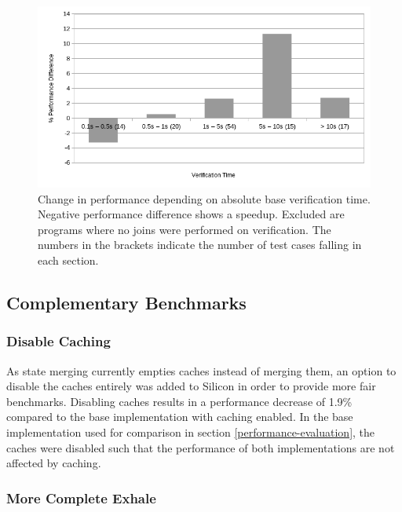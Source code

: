 \documentclass[11pt]{article}
\begin{document}
    \begin{figure}[H]
        \includegraphics[width=\linewidth]{performance-change-vs-verification-time-part-2-no-warnings-counted.png}
        \caption{
            Change in performance depending on absolute base verification time.
            Negative performance difference shows a speedup.
            Excluded are programs where no joins were performed on verification.
            The numbers in the brackets indicate the number of test cases falling in each section.
        }
        \label{fig:absolute-verification-time}
    \end{figure}

    \subsection{Complementary Benchmarks}

    \subsubsection{Disable Caching} \label{disable-caching}

    As state merging currently empties caches instead of merging them, an
    option to disable the caches entirely was added to Silicon in order to
    provide more fair benchmarks.
    Disabling caches results in a performance decrease of 1.9\%
    compared to the base implementation with caching enabled. In the base implementation used
    for comparison in section \ref{performance-evaluation}, the caches were disabled
    such that the performance of both implementations are not affected by caching.

    \subsubsection{More Complete Exhale} \label{more-complete-exhale}
\end{document}
